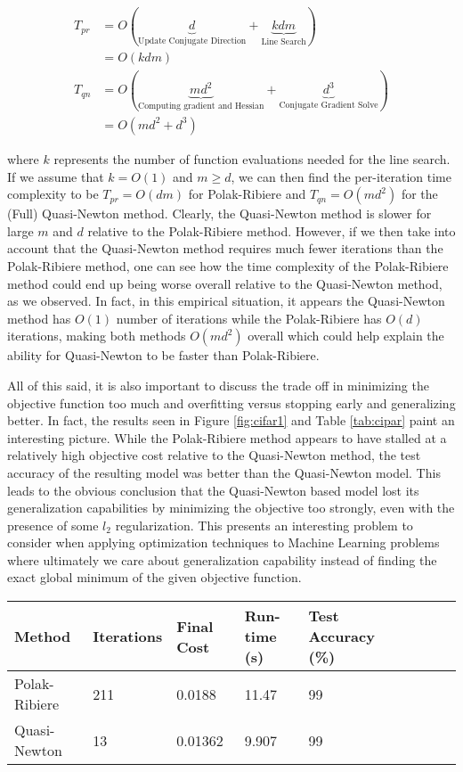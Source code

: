 \begin{align*}
    T_{pr} &= O\left( \underbrace{d}_{\text{Update Conjugate Direction}} + \underbrace{k dm}_{\text{Line Search}} \right) \\
    &= O\left(kdm\right) \\
    T_{qn} &= O\left(\underbrace{md^2}_{\text{Computing gradient and Hessian}} + \underbrace{d^3}_{\text{Conjugate Gradient Solve}}\right) \\
    &= O\left(md^2 + d^3\right)
\end{align*}

where $k$ represents the number of function evaluations needed for the line search. If we assume that $k = O(1)$ and $m \geq d$, we can then find the per-iteration time complexity to be $T_{pr} = O(dm)$ for Polak-Ribiere and $T_{qn} = O(md^2)$ for the (Full) Quasi-Newton method. Clearly, the Quasi-Newton method is slower for large $m$ and $d$ relative to the Polak-Ribiere method. However, if we then take into account that the Quasi-Newton method requires much fewer iterations than the Polak-Ribiere method, one can see how the time complexity of the Polak-Ribiere method could end up being worse overall relative to the Quasi-Newton method, as we observed. In fact, in this empirical situation, it appears the Quasi-Newton method has $O(1)$ number of iterations while the Polak-Ribiere has $O(d)$ iterations, making both methods $O(md^2)$ overall which could help explain the ability for Quasi-Newton to be faster than Polak-Ribiere.

All of this said, it is also important to discuss the trade off in minimizing the objective function too much and overfitting versus stopping early and generalizing better. In fact, the results seen in Figure \ref{fig:cifar1} and Table \ref{tab:cipar} paint an interesting picture. While the Polak-Ribiere method appears to have stalled at a relatively high objective cost relative to the Quasi-Newton method, the test accuracy of the resulting model was better than the Quasi-Newton model. This leads to the obvious conclusion that the Quasi-Newton based model lost its generalization capabilities by minimizing the objective too strongly, even with the presence of some $l_2$ regularization. This presents an interesting problem to consider when applying optimization techniques to Machine Learning problems where ultimately we care about generalization capability instead of finding the exact global minimum of the given objective function.

\begin{minipage}{\linewidth}
\centering
{} \label{tab:mnist}
\begin{tabular}{l|l l l l|l l l l}
\toprule[1.5pt]
    \bf Method & \bf Iterations & \bf Final Cost & \bf Run-time (s) & \bf Test Accuracy (\%) \\ \hline
    Polak-Ribiere & 211& 0.0188& 11.47& 99\\
    Quasi-Newton & 13& 0.01362& 9.907& 99\\
\bottomrule[1.25pt]
\end{tabular}
\bigskip
\end{minipage}

